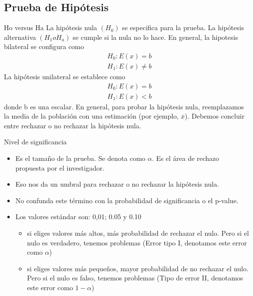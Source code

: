 \subsection{Prueba de Hipótesis}
\begin{frame}{Ho versus Ha}
	La hipótesis nula $(H_0)$ se especifica para la prueba. La hipótesis alternativa $(H_1 o H_a)$ se cumple si la nula no lo hace. En general, la hipotesis bilateral se configura como
		\begin{align*}
			&H_0 : E(x) = b\\
			&H_1 : E(x) \neq b
		\end{align*}
	La hipótesis unilateral se establece como
		\begin{align*}
			&H_0 : E(x) = b\\
			&H_1 : E(x) < b
		\end{align*}
	donde b es una escalar. En general, para probar la hipótesis nula, reemplazamos la media de la población con una estimación (por ejemplo, $\overline{x}$). Debemos concluir entre rechazar o no rechazar la hipótesis nula.
\end{frame}
\begin{frame}{Nivel de significancia}
	\begin{itemize}
		\item Es el tamaño de la prueba. Se denota como $\alpha$. Es el área de rechazo propuesta por el investigador.
		\item Eso nos da un umbral para rechazar o no rechazar la hipótesis nula.
		\item No confunda este término con la probabilidad de significancia o el p-value.
		\item Los valores estándar son: 0,01; 0.05 y 0.10
			\begin{itemize}
				\item si eliges valores más altos, más probabilidad de rechazar el nulo. Pero si el nulo es verdadero, tenemos problemas (Error tipo I, denotamos este error como $\alpha$)
				\item si eliges valores más pequeños, mayor probabilidad de no rechazar el nulo. Pero si el nulo es falso, tenemos problemas (Tipo de error II, denotamos este error como $1-\alpha$)
			\end{itemize}
	\end{itemize}
\end{frame}

